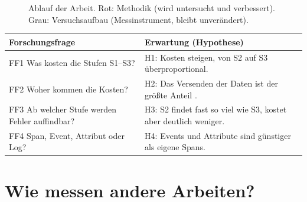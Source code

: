 \documentclass[11pt, a4paper]{article}
\begin{document}
\begin{figure}[H]
\centering
{}
\caption{Ablauf der Arbeit. Rot: Methodik (wird untersucht und verbessert). Grau: Versuchsaufbau (Messinstrument, bleibt unverändert).}
\label{fig:ueberblick}
\end{figure}

\begin{center}
\small
\begin{tabularx}{\textwidth}{@{}l X@{}}
\toprule
\textbf{Forschungsfrage} & \textbf{Erwartung (Hypothese)} \\
\midrule
FF1 Was kosten die Stufen S1--S3? & H1: Kosten steigen, von S2 auf S3 überproportional. \\
FF2 Woher kommen die Kosten? & H2: Das Versenden der Daten ist der größte Anteil \cite{nou2025tracing}. \\
FF3 Ab welcher Stufe werden Fehler auffindbar? & H3: S2 findet fast so viel wie S3, kostet aber deutlich weniger. \\
FF4 Span, Event, Attribut oder Log? & H4: Events und Attribute sind günstiger als eigene Spans. \\
\bottomrule
\end{tabularx}
\end{center}

\section{Wie messen andere Arbeiten?}\label{sec:verwandt}
\end{document}
